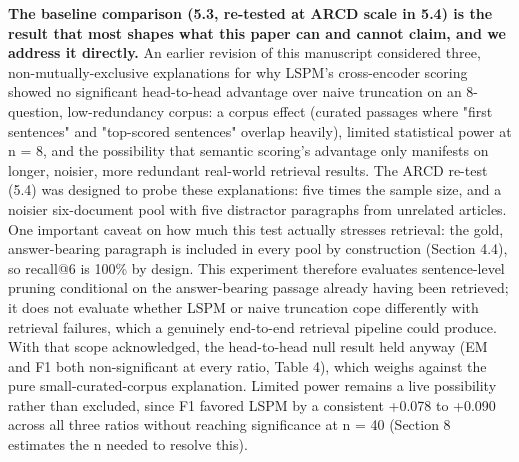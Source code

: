\documentclass[pdflatex,sn-basic,Numbered]{sn-jnl}
\begin{document}
\textbf{The baseline comparison (5.3, re-tested at ARCD scale in 5.4) is the result that most shapes what this paper can and cannot claim, and we address it directly.} An earlier revision of this manuscript considered three, non-mutually-exclusive explanations for why LSPM's cross-encoder scoring showed no significant head-to-head advantage over naive truncation on an 8-question, low-redundancy corpus: a corpus effect (curated passages where "first sentences" and "top-scored sentences" overlap heavily), limited statistical power at n = 8, and the possibility that semantic scoring's advantage only manifests on longer, noisier, more redundant real-world retrieval results. The ARCD re-test (5.4) was designed to probe these explanations: five times the sample size, and a noisier six-document pool with five distractor paragraphs from unrelated articles. One important caveat on how much this test actually stresses retrieval: the gold, answer-bearing paragraph is included in every pool by construction (Section 4.4), so recall@6 is 100\% by design. This experiment therefore evaluates sentence-level pruning conditional on the answer-bearing passage already having been retrieved; it does not evaluate whether LSPM or naive truncation cope differently with retrieval failures, which a genuinely end-to-end retrieval pipeline could produce. With that scope acknowledged, the head-to-head null result held anyway (EM and F1 both non-significant at every ratio, Table 4), which weighs against the pure small-curated-corpus explanation. Limited power remains a live possibility rather than excluded, since F1 favored LSPM by a consistent +0.078 to +0.090 across all three ratios without reaching significance at n = 40 (Section 8 estimates the n needed to resolve this).
\end{document}
